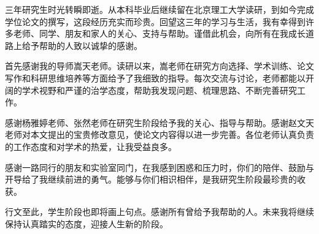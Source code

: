 
\begin{acknowledgements}

三年研究生时光转瞬即逝。从本科毕业后继续留在北京理工大学读研，到如今完成学位论文的撰写，这段经历充实而珍贵。回望这三年的学习与生活，我有幸得到许多老师、同学、朋友和家人的关心、支持与帮助。谨借此机会，向所有在我成长道路上给予帮助的人致以诚挚的感谢。

首先感谢我的导师嵩天老师。读研以来，嵩老师在研究方向选择、学术训练、论文写作和科研思维培养等方面给予了我细致的指导。每次交流与讨论，老师都能以开阔的学术视野和严谨的治学态度，帮助我发现问题、梳理思路、不断完善研究工作。

感谢杨雅婷老师、张然老师在研究生阶段给予我的关心、指导与帮助。感谢赵文天老师对本文提出的宝贵修改意见，使论文内容得以进一步完善。各位老师认真负责的工作态度和对学术的热爱，让我受益良多。

感谢一路同行的朋友和实验室同门，在我感到困惑和压力时，你们的陪伴、鼓励与开导给了我继续前进的勇气。能够与你们相识相伴，是我研究生阶段最珍贵的收获。

行文至此，学生阶段也即将画上句点。感谢所有曾给予我帮助的人。未来我将继续保持认真踏实的态度，迎接人生新的阶段。



\end{acknowledgements}
